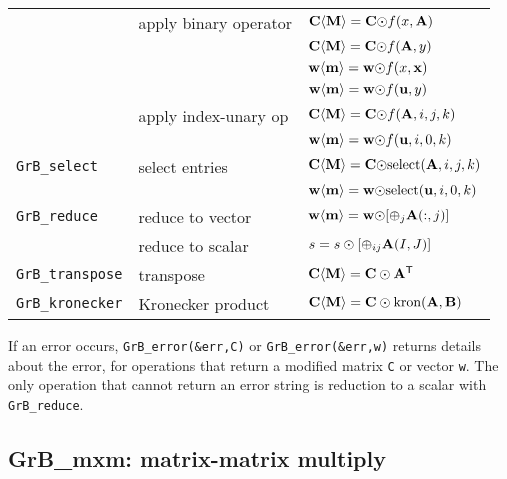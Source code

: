 \documentclass[12pt]{article}
\begin{document}
{{\begin{tabular}{lll}
                     & apply binary operator   & ${\bf C \langle M \rangle = C \odot} f(x,{\bf A})$ \\
                     &                         & ${\bf C \langle M \rangle = C \odot} f({\bf A},y)$ \\
                     &                         & ${\bf w \langle m \rangle = w \odot} f(x,{\bf x})$ \\
                     &                         & ${\bf w \langle m \rangle = w \odot} f({\bf u},y)$ \\
                     & apply index-unary op    & ${\bf C \langle M \rangle = C \odot} f({\bf A},i,j,k)$ \\
                     &                         & ${\bf w \langle m \rangle = w \odot} f({\bf u},i,0,k)$ \\
\hline
\verb'GrB_select'    & select entries          & ${\bf C \langle M \rangle = C \odot} \mbox{select}({\bf A},i,j,k)$ \\
                     &                         & ${\bf w \langle m \rangle = w \odot} \mbox{select}({\bf u},i,0,k)$ \\
\hline
\verb'GrB_reduce'    & reduce to vector        & ${\bf w \langle m \rangle = w \odot} [{\oplus}_j {\bf A}(:,j)]$ \\
                     & reduce to scalar        & $s = s \odot [{\oplus}_{ij}  {\bf A}(I,J)]$ \\
\hline
\verb'GrB_transpose' & transpose               & ${\bf C \langle M \rangle = C \odot A^{\sf T}}$ \\
\hline
\verb'GrB_kronecker' & Kronecker product       & ${\bf C \langle M \rangle = C \odot \mbox{kron}(A, B)}$ \\
\hline
\end{tabular}
}
\vspace{0.2in}

If an error occurs, \verb'GrB_error(&err,C)' or \verb'GrB_error(&err,w)'
returns details about the error, for operations that return a modified matrix
\verb'C' or vector \verb'w'.  The only operation that cannot return an error
string is reduction to a scalar with \verb'GrB_reduce'.

\newpage
\subsection{{\sf GrB\_mxm:} matrix-matrix multiply} %
\label{mxm}

}
\end{document}
